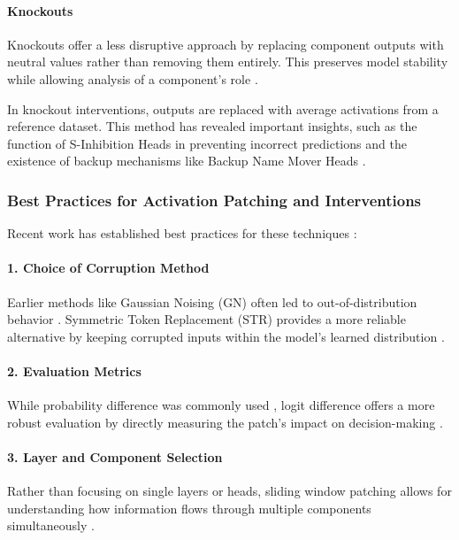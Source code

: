 \documentclass[sigconf,authoryear]{acmart}
\begin{document}
  \paragraph{Knockouts}
  Knockouts offer a less disruptive approach by replacing component outputs with neutral values rather than removing them entirely. This preserves model stability while allowing analysis of a component's role \citep{wang2022interpretabilitywildcircuitindirect}.
  
  In knockout interventions, outputs are replaced with average activations from a reference dataset. This method has revealed important insights, such as the function of S-Inhibition Heads in preventing incorrect predictions and the existence of backup mechanisms like Backup Name Mover Heads \citep{wang2022interpretabilitywildcircuitindirect}.
  
  \subsubsection{Best Practices for Activation Patching and Interventions}
  
  Recent work has established best practices for these techniques \citep{zhang2024bestpracticesactivationpatching}:
  
  \paragraph{1. Choice of Corruption Method}
  Earlier methods like Gaussian Noising (GN) often led to out-of-distribution behavior \citep{wang2022interpretabilitywildcircuitindirect, goldowskydill2023localizingmodelbehaviorpath}. Symmetric Token Replacement (STR) provides a more reliable alternative by keeping corrupted inputs within the model's learned distribution \citep{zhang2024bestpracticesactivationpatching}.
  
  \paragraph{2. Evaluation Metrics}
  While probability difference was commonly used \citep{wang2022interpretabilitywildcircuitindirect}, logit difference offers a more robust evaluation by directly measuring the patch's impact on decision-making \citep{zhang2024bestpracticesactivationpatching, hanna2023doesgpt2computegreaterthan}.
  
  \paragraph{3. Layer and Component Selection}
  Rather than focusing on single layers or heads, sliding window patching allows for understanding how information flows through multiple components simultaneously \citep{goldowskydill2023localizingmodelbehaviorpath, zhang2024bestpracticesactivationpatching}.
  
\end{document}
